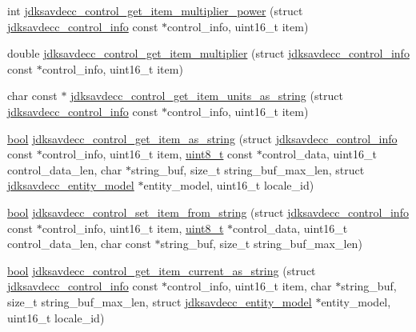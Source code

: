 \begin{DoxyCompactItemize}
\item 
int \hyperlink{group__aem__control__value__helpers_ga84b71924c92f4c789f4ffddbd5b442d5}{jdksavdecc\+\_\+control\+\_\+get\+\_\+item\+\_\+multiplier\+\_\+power} (struct \hyperlink{structjdksavdecc__control__info}{jdksavdecc\+\_\+control\+\_\+info} const $\ast$control\+\_\+info, uint16\+\_\+t item)
\item 
double \hyperlink{group__aem__control__value__helpers_gad3b8dd0acca507fe3bfb885ee7fee254}{jdksavdecc\+\_\+control\+\_\+get\+\_\+item\+\_\+multiplier} (struct \hyperlink{structjdksavdecc__control__info}{jdksavdecc\+\_\+control\+\_\+info} const $\ast$control\+\_\+info, uint16\+\_\+t item)
\item 
char const $\ast$ \hyperlink{group__aem__control__value__helpers_ga096fb31e46ecfa6b19b0f83f4ed8534f}{jdksavdecc\+\_\+control\+\_\+get\+\_\+item\+\_\+units\+\_\+as\+\_\+string} (struct \hyperlink{structjdksavdecc__control__info}{jdksavdecc\+\_\+control\+\_\+info} const $\ast$control\+\_\+info, uint16\+\_\+t item)
\item 
\hyperlink{avb__gptp_8h_af6a258d8f3ee5206d682d799316314b1}{bool} \hyperlink{group__aem__control__value__helpers_gaa0629b21c78ed34a25c54297dba922d3}{jdksavdecc\+\_\+control\+\_\+get\+\_\+item\+\_\+as\+\_\+string} (struct \hyperlink{structjdksavdecc__control__info}{jdksavdecc\+\_\+control\+\_\+info} const $\ast$control\+\_\+info, uint16\+\_\+t item, \hyperlink{stdint_8h_aba7bc1797add20fe3efdf37ced1182c5}{uint8\+\_\+t} const $\ast$control\+\_\+data, uint16\+\_\+t control\+\_\+data\+\_\+len, char $\ast$string\+\_\+buf, size\+\_\+t string\+\_\+buf\+\_\+max\+\_\+len, struct \hyperlink{structjdksavdecc__entity__model}{jdksavdecc\+\_\+entity\+\_\+model} $\ast$entity\+\_\+model, uint16\+\_\+t locale\+\_\+id)
\item 
\hyperlink{avb__gptp_8h_af6a258d8f3ee5206d682d799316314b1}{bool} \hyperlink{group__aem__control__value__helpers_ga3af9e808a38e2a6e3f98bd81c2e19e3c}{jdksavdecc\+\_\+control\+\_\+set\+\_\+item\+\_\+from\+\_\+string} (struct \hyperlink{structjdksavdecc__control__info}{jdksavdecc\+\_\+control\+\_\+info} const $\ast$control\+\_\+info, uint16\+\_\+t item, \hyperlink{stdint_8h_aba7bc1797add20fe3efdf37ced1182c5}{uint8\+\_\+t} $\ast$control\+\_\+data, uint16\+\_\+t control\+\_\+data\+\_\+len, char const $\ast$string\+\_\+buf, size\+\_\+t string\+\_\+buf\+\_\+max\+\_\+len)
\item 
\hyperlink{avb__gptp_8h_af6a258d8f3ee5206d682d799316314b1}{bool} \hyperlink{group__aem__control__value__helpers_ga140147819a676812a9ade9a735c86fa4}{jdksavdecc\+\_\+control\+\_\+get\+\_\+item\+\_\+current\+\_\+as\+\_\+string} (struct \hyperlink{structjdksavdecc__control__info}{jdksavdecc\+\_\+control\+\_\+info} const $\ast$control\+\_\+info, uint16\+\_\+t item, char $\ast$string\+\_\+buf, size\+\_\+t string\+\_\+buf\+\_\+max\+\_\+len, struct \hyperlink{structjdksavdecc__entity__model}{jdksavdecc\+\_\+entity\+\_\+model} $\ast$entity\+\_\+model, uint16\+\_\+t locale\+\_\+id)

\end{DoxyCompactItemize}
